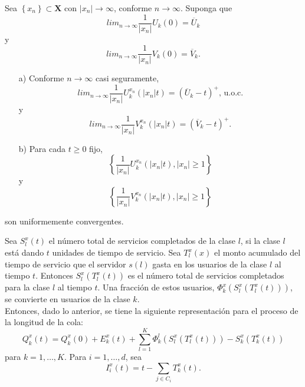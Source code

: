 \begin{Lema}\label{Lema.4.3}
Sea $\left\{x_{n}\right\}\subset \mathbf{X}$ con
$|x_{n}|\rightarrow\infty$, conforme $n\rightarrow\infty$. Suponga
que
\[lim_{n\rightarrow\infty}\frac{1}{|x_{n}|}U_{k}\left(0\right)=\overline{U}_{k}\]
y
\[lim_{n\rightarrow\infty}\frac{1}{|x_{n}|}V_{k}\left(0\right)=\overline{V}_{k}.\]
\begin{itemize}
\item[a)] Conforme $n\rightarrow\infty$ casi seguramente,
\[lim_{n\rightarrow\infty}\frac{1}{|x_{n}|}U^{x_{n}}_{k}\left(|x_{n}|t\right)=\left(\overline{U}_{k}-t\right)^{+}\textrm{, u.o.c.}\]
y
\[lim_{n\rightarrow\infty}\frac{1}{|x_{n}|}V^{x_{n}}_{k}\left(|x_{n}|t\right)=\left(\overline{V}_{k}-t\right)^{+}.\]

\item[b)] Para cada $t\geq0$ fijo,
\[\left\{\frac{1}{|x_{n}|}U^{x_{n}}_{k}\left(|x_{n}|t\right),|x_{n}|\geq1\right\}\]
y
\[\left\{\frac{1}{|x_{n}|}V^{x_{n}}_{k}\left(|x_{n}|t\right),|x_{n}|\geq1\right\}\]
\end{itemize}
son uniformemente convergentes.
\end{Lema}

Sea $S_{l}^{x}\left(t\right)$ el n\'umero total de servicios
completados de la clase $l$, si la clase $l$ est\'a dando $t$
unidades de tiempo de servicio. Sea $T_{l}^{x}\left(x\right)$ el
monto acumulado del tiempo de servicio que el servidor
$s\left(l\right)$ gasta en los usuarios de la clase $l$ al tiempo
$t$. Entonces $S_{l}^{x}\left(T_{l}^{x}\left(t\right)\right)$ es
el n\'umero total de servicios completados para la clase $l$ al
tiempo $t$. Una fracci\'on de estos usuarios,
$\Phi_{k}^{x}\left(S_{l}^{x}\left(T_{l}^{x}\left(t\right)\right)\right)$,
se convierte en usuarios de la clase $k$.\\

Entonces, dado lo anterior, se tiene la siguiente representaci\'on
para el proceso de la longitud de la cola:\\

\begin{equation}
Q_{k}^{x}\left(t\right)=Q_{k}^{x}\left(0\right)+E_{k}^{x}\left(t\right)+\sum_{l=1}^{K}\Phi_{k}^{l}\left(S_{l}^{x}\left(T_{l}^{x}\left(t\right)\right)\right)-S_{k}^{x}\left(T_{k}^{x}\left(t\right)\right)
\end{equation}
para $k=1,\ldots,K$. Para $i=1,\ldots,d$, sea
\[I_{i}^{x}\left(t\right)=t-\sum_{j\in C_{i}}T_{k}^{x}\left(t\right).\]

